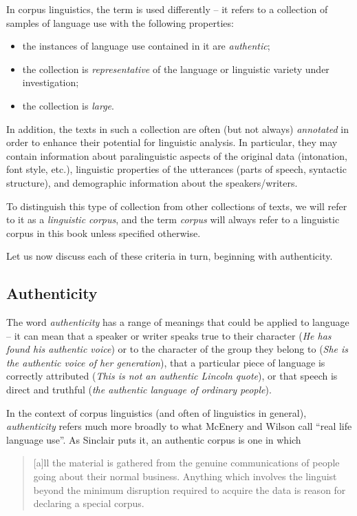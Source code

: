 In corpus linguistics, the term is used differently -- it refers to a collection of samples of language use with the following properties:

\begin{itemize}
\item the instances of language use contained in it are \emph{authentic};
\item the collection is \emph{representative} of the language or linguistic variety under investigation;
\item the collection is \emph{large}.
\end{itemize}

In addition, the texts in such a collection are often (but not always) \emph{annotated} in order to enhance their potential for linguistic analysis. In particular, they may contain information about paralinguistic aspects of the original data (intonation, font style, etc.), linguistic properties of the utterances (parts of speech, syntactic structure), and demographic information about the speakers/writers.

To distinguish this type of collection from other collections of texts, we will refer to it as a \emph{linguistic corpus}, and the term \emph{corpus} will always refer to a linguistic corpus in this book unless specified otherwise.

Let us now discuss each of these criteria in turn, beginning with authenticity. 

\subsection{Authenticity}
\label{sec:authenticity}

The word \emph{authenticity} has a range of meanings that could be applied to language -- it can mean that a speaker or writer speaks true to their character (\textit{He has found his authentic voice}) or to the character of the group they belong to (\textit{She is the authentic voice of her generation}), that a particular piece of language is correctly attributed (\textit{This is not an authentic Lincoln quote}), or that speech is direct and truthful (\textit{the authentic language of ordinary people}).

In the context of corpus linguistics (and often of linguistics in general), \emph{authenticity} refers much more broadly to what McEnery and Wilson call ``real life language use''. As Sinclair puts it, an authentic corpus is one in which

\begin{quotation}
[a]ll the material is gathered from the genuine communications of people going about their normal business. Anything which involves the linguist beyond the minimum disruption required to acquire the data is reason for declaring a special corpus. \citep{sinclair_eagles_1996}
\end{quotation}

